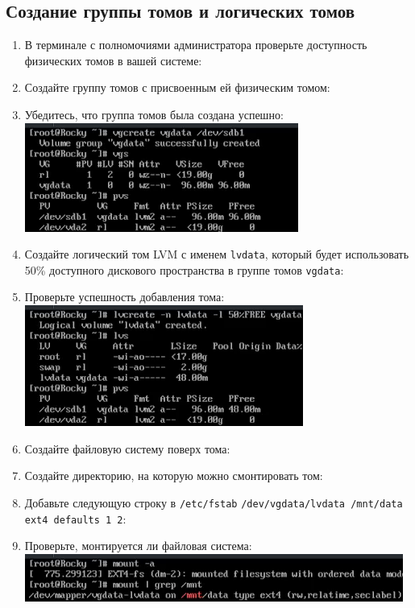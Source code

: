 \documentclass[12pt]{article}
\begin{document}
\subsection{Создание группы томов и логических томов}
\begin{enumerate}
	\item В терминале с полномочиями администратора проверьте доступность физических
	      томов в вашей системе:
	\item Создайте группу томов с присвоенным ей физическим томом:
	\item Убедитесь, что группа томов была создана успешно:
	      \\\includegraphics{6.png}
	\item Создайте логический том LVM с именем \texttt{lvdata}, который будет использовать
	      50\% доступного дискового пространства в группе томов \texttt{vgdata}:
	\item Проверьте успешность добавления тома:
	      \\\includegraphics{7.png}
	\item Создайте файловую систему поверх тома:
	\item Создайте директорию, на которую можно смонтировать том:
	\item Добавьте следующую строку в \texttt{/etc/fstab} \texttt{/dev/vgdata/lvdata /mnt/data ext4 defaults 1 2}:
	\item Проверьте, монтируется ли файловая система:
	      \\\includegraphics{9.png}
\end{enumerate}
\end{document}
